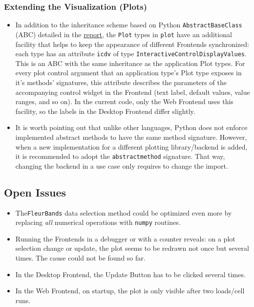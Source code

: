\subsubsection{Extending the Visualization
  (Plots)}\label{extending-the-visualization-plots}

\begin{itemize}
    \tightlist
\item
    In addition to the inheritance scheme based on Python
    \texttt{AbstractBaseClass} (ABC) detailed in the
    \href{./doc/report.pdf}{report}, the \texttt{Plot} types in
    \texttt{plot} have an additional facility that helps to keep the
    appearance of different Frontends synchronized: each type has an
    attribute \texttt{icdv} of type
    \texttt{InteractiveControlDisplayValues}. This is an ABC with the same
    inheritance as the application Plot types. For every plot control
    argument that an application type's Plot type exposes in it's methods'
    signatures, this attribute describes the parameters of the
    accompanying control widget in the Frontend (text label, default
    values, value ranges, and so on). In the current code, only the Web
    Frontend uses this facility, so the labels in the Desktop Frontend
    differ slightly.\\
\item
    It is worth pointing out that unlike other languages, Python does not
    enforce implemented abstract methods to have the same method
    signature. However, when a new implementation for a different plotting
    library/backend is added, it is recommended to adopt the
    \texttt{abstractmethod} signature. That way, changing the backend in a
    use case only requires to change the import.
\end{itemize}

\subsection{Open Issues}
\label{sec:open-issues}

\begin{itemize}
\item The\texttt{FleurBands} data selection method could be optimized even more by
    replacing \textit{all} numerical operations with \texttt{numpy} routines.
\item Running the Frontends in a debugger or with a counter reveals: on a plot
    selection change or update, the plot seems to be redrawn not once but
    several times. The cause could not be found so far.
\item In the Desktop Frontend, the Update Button has to be clicked several times.
\item In the Web Frontend, on startup, the plot is only visible after two loads/cell runs.   
\end{itemize}


